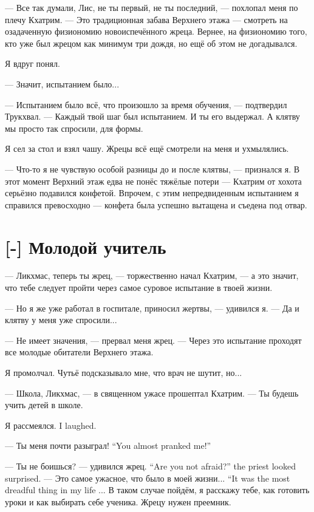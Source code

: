 --- Все так думали, Лис, не ты первый, не ты последний, --- похлопал меня по плечу Кхатрим.
--- Это традиционная забава Верхнего этажа --- смотреть на озадаченную физиономию новоиспечённого жреца.
Вернее, на физиономию того, кто уже был жрецом как минимум три дождя, но ещё об этом не догадывался.

Я вдруг понял.

--- Значит, испытанием было...

--- Испытанием было всё, что произошло за время обучения, --- подтвердил Трукхвал.
--- Каждый твой шаг был испытанием.
И ты его выдержал.
А клятву мы просто так спросили, для формы.

Я сел за стол и взял чашу.
Жрецы всё ещё смотрели на меня и ухмылялись.

--- Что-то я не чувствую особой разницы до и после клятвы, --- признался я.
В этот момент Верхний этаж едва не понёс тяжёлые потери --- Кхатрим от хохота серьёзно подавился конфетой.
Впрочем, с этим непредвиденным испытанием я справился превосходно --- конфета была успешно вытащена и съедена под отвар.

\section{[-] Молодой учитель}

\textspace

--- Ликхмас, теперь ты жрец, --- торжественно начал Кхатрим, --- а это значит, что тебе следует пройти через самое суровое испытание в твоей жизни.

--- Но я же уже работал в госпитале, приносил жертвы, --- удивился я.
--- Да и клятву у меня уже спросили...

--- Не имеет значения, --- прервал меня жрец.
--- Через это испытание проходят все молодые обитатели Верхнего этажа.

Я промолчал.
Чутьё подсказывало мне, что врач не шутит, но...

--- Школа, Ликхмас, --- в священном ужасе прошептал Кхатрим.
--- Ты будешь учить детей в школе.

{Я рассмеялся.}
{I laughed.}

{--- Ты меня почти разыграл!}
{``You almost pranked me!''}

{--- Ты не боишься? --- удивился жрец.}
{``Are you not afraid?'' the priest looked surprised.}
{--- Это самое ужасное, что было в моей жизни...}
{``It was the most dreadful thing in my life ...}
В таком случае пойдём, я расскажу тебе, как готовить уроки и как выбирать себе ученика.
Жрецу нужен преемник.

